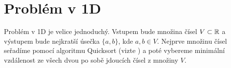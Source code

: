 \chapter{Problém v 1D}
\label{chap:problem_1D}
Problém v 1D je velice jednoduchý. Vstupem bude množina čísel $V \subset \mathbb{R}$ a výstupem bude nejkratší úsečka $\{a, b\}$, kde $ a, b \in V$. Nejprve množinu čísel seřadíme pomocí algoritmu Quicksort (vizte \autocite{10.1093/comjnl/5.1.10}) a poté vybereme minimální vzdálenost ze všech dvou po sobě jdoucích čísel z množiny $V$.

